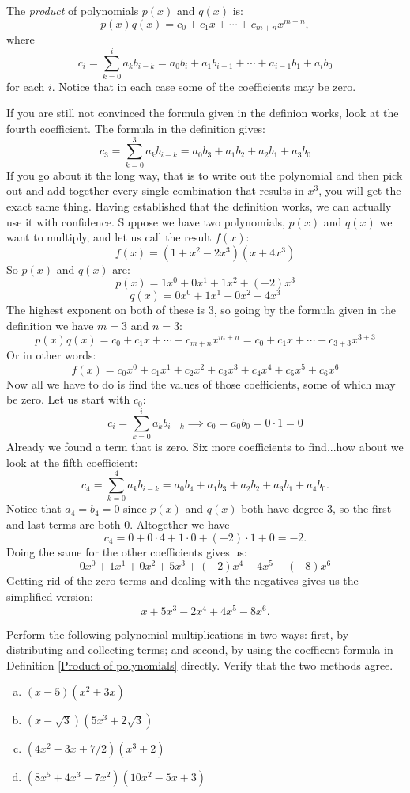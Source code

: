 \begin{defn}\label{Product of polynomials}

The \emph{product} of polynomials $p(x)$ and $q(x)$ is: 
\[
p(x) q(x) = c_0 + c_1 x + \cdots + c_{m + n} x^{m + n},
\]
where
\[
c_i = \sum_{k = 0}^i a_k b_{i - k} = a_0  b_i + a_1 b_{i -1} + \cdots + a_{i -1} b _1 + a_i b_0
\]
for each $i$.  Notice that in each case some of the coefficients may be zero.
\end {defn}

If you are still not convinced the formula given in the definion works, look at the fourth coefficient.  The formula in the definition gives:
\[ c_3 = \sum_{k = 0}^3 a_k b_{i - k} =  a_0b_3 + a_1b_2 +a_2b_1 + a_3b_0  \]
If you go about it the long way, that is to write out the polynomial and then pick out and add together every single combination that results in $x^3$, you will get the exact same thing.  Having established that the definition works, we can actually use it with confidence.  Suppose we have two polynomials, $p(x)$ and $q(x)$ we want to multiply, and let us call the result $f(x)$:
\[ f(x)=(1+x^2-2x^3)(x+4x^3) \]
So $p(x)$ and $q(x)$ are:
\[p(x)= 1x^0 + 0x^1 + 1x^2 + (-2)x^3 \]
\[q(x)= 0x^0 + 1x^1 + 0x^2 + 4x^3 \]
The highest exponent on both of these is 3, so going by the formula given in the definition we have $m=3$ and $n=3$:
\[
p(x) q(x) = c_0 + c_1 x + \cdots + c_{m + n} x^{m + n} = c_0 + c_1 x + \cdots + c_{3 + 3} x^{3 + 3} 
\]
Or in other words:
\[ f(x)= c_0x^0 + c_1x^1 + c_2x^2 + c_3x^3 + c_4x^4 + c_5x^5 + c_6x^6 \]
Now all we have to do is find the values of those coefficients, some of which may be zero.  Let us start with $c_0$:
\[ c_i = \sum_{k = 0}^i a_k b_{i - k} \implies  c_0 = a_0b_0= 0 \cdot 1 = 0 \]
Already we found a term that is zero.  Six more coefficients to find...how about we look at the fifth coefficient:
\[ c_4 =  \sum_{k = 0}^4 a_k b_{i - k} =   a_0b_4 + a_1b_3 +a_2b_2 + a_3b_1 + a_4b_0.\]
Notice that $a_4=b_4=0$ since $p(x)$ and $q(x)$ both have degree 3, so the first and last terms are both 0. Altogether we have 
\[ c_4=0+0\cdot 4+1\cdot 0+(-2)\cdot 1+0=-2.\]
Doing the same for the other coefficients gives us:
\[ 0x^0+ 1x^1 + 0x^2 + 5x^3 + (-2)x^4 + 4x^5 + (-8)x^6 \]
Getting rid of the zero terms and dealing with the negatives gives us the simplified version:
\[x+5x^3-2x^4+4x^5-8x^6. \]
\begin {exercise}{}
Perform the following polynomial multiplications in two ways: first, by distributing and collecting terms; and second, by using the coefficent formula in Definition \ref{Product of polynomials} directly.  Verify that the two methods agree.
\begin {enumerate}[(a)]
\item
$(x-5)(x^2+3x)$
\item
$(x-\sqrt{3})(5x^3+2\sqrt{3})$
\item
$(4x^2 - 3x + 7/2)(x^3+2)$
\item
$(8x^5 + 4x^3 - 7x^2)(10x^2 - 5x + 3)$
\end{enumerate}
\end {exercise}

